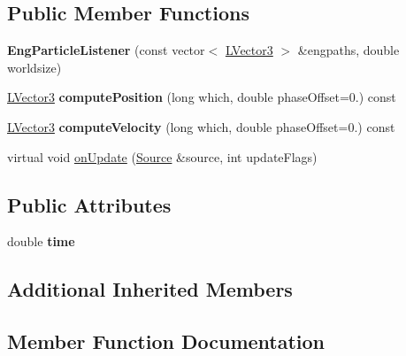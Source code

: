 \subsection*{Public Member Functions}
\begin{DoxyCompactItemize}
\item 
{\bfseries Eng\+Particle\+Listener} (const vector$<$ \hyperlink{classAudio_1_1TVector3}{L\+Vector3} $>$ \&engpaths, double worldsize)\hypertarget{classAudio_1_1Test_1_1EngParticleListener_a34e0e6cd17de84d7b1739eeede972dd7}{}\label{classAudio_1_1Test_1_1EngParticleListener_a34e0e6cd17de84d7b1739eeede972dd7}

\item 
\hyperlink{classAudio_1_1TVector3}{L\+Vector3} {\bfseries compute\+Position} (long which, double phase\+Offset=0.) const \hypertarget{classAudio_1_1Test_1_1EngParticleListener_a036c2348ef920e83876db90eda7ca4d2}{}\label{classAudio_1_1Test_1_1EngParticleListener_a036c2348ef920e83876db90eda7ca4d2}

\item 
\hyperlink{classAudio_1_1TVector3}{L\+Vector3} {\bfseries compute\+Velocity} (long which, double phase\+Offset=0.) const \hypertarget{classAudio_1_1Test_1_1EngParticleListener_af81e9aa6320814a60e3a2181ca94b239}{}\label{classAudio_1_1Test_1_1EngParticleListener_af81e9aa6320814a60e3a2181ca94b239}

\item 
virtual void \hyperlink{classAudio_1_1Test_1_1EngParticleListener_a9d18798d9a8565b367f65350268b26be}{on\+Update} (\hyperlink{classAudio_1_1Source}{Source} \&source, int update\+Flags)
\end{DoxyCompactItemize}
\subsection*{Public Attributes}
\begin{DoxyCompactItemize}
\item 
double {\bfseries time}\hypertarget{classAudio_1_1Test_1_1EngParticleListener_afd588af19aabd1a0a3e4bb1bc539c7e3}{}\label{classAudio_1_1Test_1_1EngParticleListener_afd588af19aabd1a0a3e4bb1bc539c7e3}

\end{DoxyCompactItemize}
\subsection*{Additional Inherited Members}


\subsection{Member Function Documentation}
